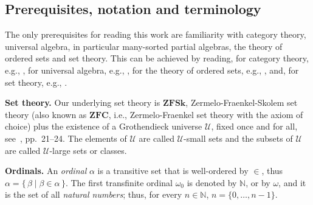 \documentclass[a4paper, reqno
]{amsart}
\theoremstyle{plain}
\theoremstyle{definition}
\begin{document}
\subsection{Prerequisites, notation and terminology}

The only prerequisites for reading this work are familiarity with category theory, universal algebra, in particular many-sorted partial algebras, the theory of ordered sets and set theory.
This can be achieved by reading, for category theory, e.g., \cite{hs73,sM98}, for universal algebra, e.g., \cite{gb15,pb82,pb86,pb02,bs81,gtw85,gG08,agk67,sch66,sch70,w92}, for the theory of ordered sets, e.g., \cite{bl05,DP02,R08}, and, for set theory, e.g., \cite{nB70,end77}.

\textbf{Set theory.} Our underlying set theory is $\mathbf{ZFSk}$, Zermelo-Fraenkel-Skolem set theory (also known as $\mathbf{ZFC}$, i.e., Zermelo-Fraenkel set theory with the axiom of choice) plus the existence of a Grothendieck universe $\boldsymbol{\mathcal{U}}$, fixed once and for all, see~\cite{sM98}, pp.~21--24.
The elements of $\boldsymbol{\mathcal{U}}$ are called $\boldsymbol{\mathcal{U}}$-small sets and the subsets of $\boldsymbol{\mathcal{U}}$ are called $\boldsymbol{\mathcal{U}}$-large sets or classes.

\textbf{Ordinals.} An \emph{ordinal} $\alpha$ is a transitive set that is well-ordered by $\in$, thus $\alpha=\{\,\beta\mid\beta\in\alpha\,\}$.
The first transfinite ordinal $\omega_{0}$ is denoted by $\mathbb{N}$, or by $\omega$, and it is the set of all \emph{natural numbers}; thus, for every $n\in\mathbb{N}$, $n=\{0,\ldots,n-1\}$.
\end{document}
